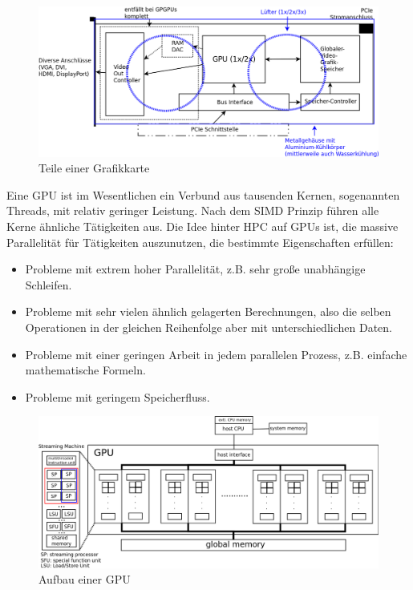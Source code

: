         \begin{figure}[h]
			\centering
    		    \includegraphics[width=\textwidth]{chapter2/pictures/gpu.png}
    		    \caption[Grafikkarte]{Teile einer Grafikkarte}
    		    \label{2:graka}
		\end{figure}
		
		Eine GPU ist im Wesentlichen ein Verbund aus tausenden Kernen, sogenannten \Glspl{Thread}, mit relativ geringer Leistung. Nach dem SIMD Prinzip führen alle Kerne ähnliche Tätigkeiten aus. Die Idee hinter HPC auf GPUs ist, die massive Parallelität für Tätigkeiten auszunutzen, die bestimmte Eigenschaften erfüllen:
		\begin{itemize}
			\item Probleme mit extrem hoher Parallelität, z.B. sehr große unabhängige Schleifen.
			\item Probleme mit sehr vielen ähnlich gelagerten Berechnungen, also die selben Operationen in der gleichen Reihenfolge aber mit unterschiedlichen Daten.
			\item Probleme mit einer geringen \Gls{Arbeit} in jedem parallelen Prozess, z.B. einfache mathematische Formeln.
			\item Probleme mit geringem Speicherfluss.			
		\end{itemize}
			
		\begin{figure}[h]
			\centering
    	        \includegraphics[width=\textwidth]{chapter2/pictures/sm.png}
    	        \caption[GPU]{Aufbau einer GPU}
    		    \label{2:gpu}
		\end{figure}
		
